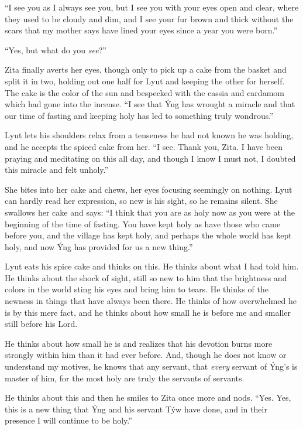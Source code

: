 ``I see you as I always see you, but I see you with your eyes open and clear, where they used to be cloudy and dim, and I see your fur brown and thick without the scars that my mother says have lined your eyes since a year you were born.''

``Yes, but what do you \emph{see}?''

Zita finally averts her eyes, though only to pick up a cake from the basket and split it in two, holding out one half for Lyut and keeping the other for herself. The cake is the color of the sun and bespecked with the cassia and cardamom which had gone into the incense. ``I see that Ýng has wrought a miracle and that our time of fasting and keeping holy has led to something truly wondrous.''

Lyut lets his shoulders relax from a tenseness he had not known he was holding, and he accepts the spiced cake from her. ``I see. Thank you, Zita. I have been praying and meditating on this all day, and though I know I must not, I doubted this miracle and felt unholy.''

She bites into her cake and chews, her eyes focusing seemingly on nothing. Lyut can hardly read her expression, so new is his sight, so he remains silent. She swallows her cake and says: ``I think that you are as holy now as you were at the beginning of the time of fasting. You have kept holy as have those who came before you, and the village has kept holy, and perhaps the whole world has kept holy, and now Ýng has provided for us a new thing.''

Lyut eats his spice cake and thinks on this. He thinks about what I had told him. He thinks about the shock of sight, still so new to him that the brightness and colors in the world sting his eyes and bring him to tears. He thinks of the newness in things that have always been there. He thinks of how overwhelmed he is by this mere fact, and he thinks about how small he is before me and smaller still before his Lord.

He thinks about how small he is and realizes that his devotion burns more strongly within him than it had ever before. And, though he does not know or understand my motives, he knows that any servant, that \emph{every} servant of Ýng's is master of him, for the most holy are truly the servants of servants.

He thinks about this and then he smiles to Zita once more and nods. ``Yes. Yes, this is a new thing that Ýng and his servant Týw have done, and in their presence I will continue to be holy.''

